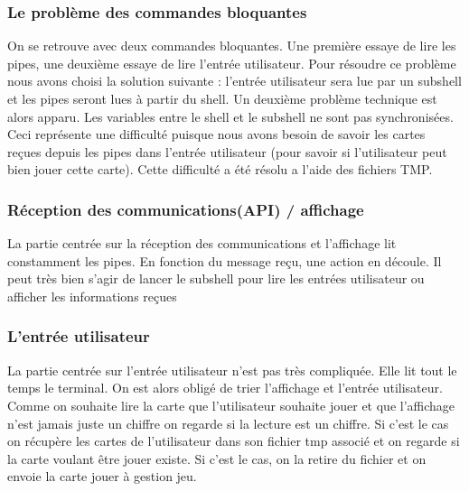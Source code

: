 \documentclass{article}
\begin{document}
\subsubsection{Le problème des commandes bloquantes}
On se retrouve avec deux commandes bloquantes. Une première essaye de lire les pipes, une deuxième essaye de lire l'entrée utilisateur. Pour résoudre ce problème nous avons choisi la solution suivante : l'entrée utilisateur sera lue par un subshell et les pipes seront lues à partir du shell. Un deuxième problème technique est alors apparu. Les variables entre le shell et le subshell ne sont pas synchronisées. Ceci représente une difficulté puisque nous avons besoin de savoir les cartes reçues depuis les pipes dans l'entrée utilisateur (pour savoir si l'utilisateur peut bien jouer cette carte). Cette difficulté a été résolu a l'aide des fichiers TMP.

\subsubsection{Réception des communications(API) / affichage}
La partie centrée sur la réception des communications et l'affichage lit constamment les pipes. En fonction du message reçu, une action en découle. Il peut très bien s'agir de lancer le subshell pour lire les entrées utilisateur ou afficher les informations reçues

\subsubsection{L'entrée utilisateur}
La partie centrée sur l'entrée utilisateur n'est pas très compliquée. Elle lit tout le temps le terminal. On est alors obligé de trier l'affichage et l'entrée utilisateur. Comme on souhaite lire la carte que l'utilisateur souhaite jouer et que l'affichage n'est jamais juste un chiffre on regarde si la lecture est un chiffre. Si c'est le cas on récupère les cartes de l'utilisateur dans son fichier tmp associé et on regarde si la carte voulant être jouer existe. Si c'est le cas, on la retire du fichier et on envoie la carte jouer à gestion jeu. 
\end{document}
